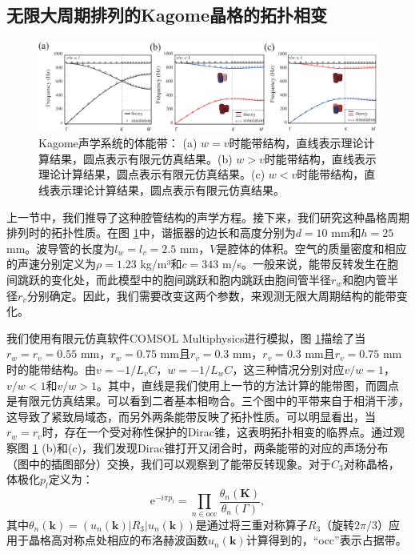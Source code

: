 \subsection{无限大周期排列的Kagome晶格的拓扑相变}

\begin{figure}[h!]
  \centering
  \includegraphics[width=1\textwidth]{images/fig3-4.eps} 
  \caption{Kagome声学系统的体能带：
  (a) $w=v$时能带结构，直线表示理论计算结果，圆点表示有限元仿真结果。(b) $w>v$时能带结构，直线表示理论计算结果，圆点表示有限元仿真结果。(c) $w<v$时能带结构，直线表示理论计算结果，圆点表示有限元仿真结果。
  }
  \label{fig_3_4}
\end{figure}

上一节中，我们推导了这种腔管结构的声学方程。接下来，我们研究这种晶格周期排列时的拓扑性质。在图 \ref{fig_3_4}中，谐振器的边长和高度分别为$d = 10$ mm和$h = 25$ mm。波导管的长度为$l_w = l_v = 2.5$ mm，$V$是腔体的体积。空气的质量密度和相应的声速分别定义为$\rho = 1.23$ kg/m³和$c = 343$ m/s。一般来说，能带反转发生在胞间跳跃的变化处，而此模型中的胞间跳跃和胞内跳跃由胞间管半径$r_w$和胞内管半径$r_v$分别确定。因此，我们需要改变这两个参数，来观测无限大周期结构的能带变化。

我们使用有限元仿真软件COMSOL Multiphysics进行模拟，图 \ref{fig_3_4}描绘了当$r_w = r_v = 0.55$ mm，$r_w = 0.75$ mm且$r_v = 0.3$ mm，$r_v = 0.3$ mm且$r_v = 0.75$ mm时的能带结构。由$v = -1/L_vC$，$w = -1/L_wC$，这三种情况分别对应$v/w=1$，$v/w<1$和$v/w>1$。其中，直线是我们使用上一节的方法计算的能带图，而圆点是有限元仿真结果。可以看到二者基本相吻合。三个图中的平带来自于相消干涉，这导致了紧致局域态，而另外两条能带反映了拓扑性质\cite{C3-1,C3-2}。可以明显看出，当$r_w = r_v$时，存在一个受对称性保护的Dirac锥，这表明拓扑相变的临界点。通过观察图 \ref{fig_3_4} (b)和(c)，我们发现Dirac锥打开又闭合时，两条能带的对应的声场分布（图中的插图部分）交换，我们可以观察到了能带反转现象。对于$C_3$对称晶格，体极化$p_l$定义为：
\begin{equation} \label{eq3-8}
  \mathrm{e}^{-i\pi p_l} = \prod_{n \in \text{occ}} \frac{\theta_n(\mathbf{K})}{\theta_n(\Gamma)},
\end{equation}
其中$\theta_n(\mathbf{k}) = (u_n(\mathbf{k})|R_{3}|u_n(\mathbf{k}))$是通过将三重对称算子$R_3$（旋转$2\pi/3$）应用于晶格高对称点处相应的布洛赫波函数$u_n(\mathbf{k})$计算得到的，“occ”表示占据带。

